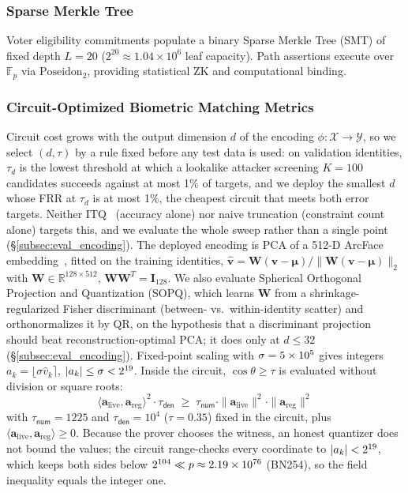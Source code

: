 \documentclass[10pt,letterpaper,journal]{IEEEtran}
\begin{document}
\subsubsection{Sparse Merkle Tree}
Voter eligibility commitments populate a binary Sparse Merkle Tree (SMT) of fixed depth $L = 20$ ($2^{20} \approx 1.04 \times 10^6$ leaf capacity). Path assertions execute over $\mathbb{F}_p$ via $\text{Poseidon}_2$, providing statistical ZK and computational binding.

\subsubsection{Circuit-Optimized Biometric Matching Metrics}
\label{sec:metric_formulation}
Circuit cost grows with the output dimension $d$ of the encoding $\phi: \mathcal{X} \to \mathcal{Y}$, so we select $(d, \tau)$ by a rule fixed before any test data is used: on validation identities, $\tau_d$ is the lowest threshold at which a lookalike attacker screening $K = 100$ candidates succeeds against at most 1\% of targets, and we deploy the smallest $d$ whose FRR at $\tau_d$ is at most 1\%, the cheapest circuit that meets both error targets. Neither ITQ~\cite{Gong2013} (accuracy alone) nor naive truncation (constraint count alone) targets this, and we evaluate the whole sweep rather than a single point (\S\ref{subsec:eval_encoding}).
The deployed encoding is PCA of a 512-D ArcFace embedding~\cite{Deng2019ArcFace}, fitted on the training identities, $\hat{\mathbf{v}} = \mathbf{W}(\mathbf{v} - \boldsymbol{\mu}) / \|\mathbf{W}(\mathbf{v} - \boldsymbol{\mu})\|_2$ with $\mathbf{W} \in \mathbb{R}^{128 \times 512}$, $\mathbf{W}\mathbf{W}^T = \mathbf{I}_{128}$. We also evaluate Spherical Orthogonal Projection and Quantization (SOPQ), which learns $\mathbf{W}$ from a shrinkage-regularized Fisher discriminant (between- vs.\ within-identity scatter) and orthonormalizes it by QR, on the hypothesis that a discriminant projection should beat reconstruction-optimal PCA; it does only at $d \le 32$ (\S\ref{subsec:eval_encoding}). Fixed-point scaling with $\sigma = 5 \times 10^{5}$ gives integers $a_k = \lfloor \sigma \hat{v}_k \rceil$, $|a_k| \le \sigma < 2^{19}$. Inside the circuit, $\cos\theta \ge \tau$ is evaluated without division or square roots:
\begin{equation}
\label{eq:sopq-circuit}
\langle \mathbf{a}_{\text{live}}, \mathbf{a}_{\text{reg}} \rangle^2 \cdot \tau_{\mathsf{den}} \;\ge\; \tau_{\mathsf{num}} \cdot \|\mathbf{a}_{\text{live}}\|^2 \cdot \|\mathbf{a}_{\text{reg}}\|^2
\end{equation}
with $\tau_{\mathsf{num}} = 1225$ and $\tau_{\mathsf{den}} = 10^4$ ($\tau = 0.35$) fixed in the circuit, plus $\langle \mathbf{a}_{\text{live}}, \mathbf{a}_{\text{reg}} \rangle \ge 0$. Because the prover chooses the witness, an honest quantizer does not bound the values; the circuit range-checks every coordinate to $|a_k| < 2^{19}$, which keeps both sides below $2^{104} \ll p \approx 2.19 \times 10^{76}$ (BN254), so the field inequality equals the integer one.
\end{document}
